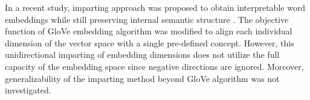 \documentclass[11pt,a4paper]{article}
\begin{document}
In a recent study, imparting approach was proposed to obtain interpretable word embeddings while still preserving internal semantic structure \citep{senel20impart}. The objective function of GloVe embedding algorithm \citep{pennington14glove} was modified to align each individual dimension of the vector space with a single pre-defined concept. However, this unidirectional imparting of embedding dimensions does not utilize the full capacity of the embedding space since negative directions are ignored. Moreover, generalizability of the imparting method beyond GloVe algorithm was not investigated.
\end{document}
